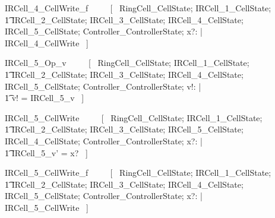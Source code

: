 \documentclass{article}
\begin{document}
\begin{zed}
IRCell\_4\_CellWrite\_f ~~~~ [~ 
    \Xi RingCell\_CellState; 
    \Xi IRCell\_1\_CellState; \\
    \t1 \Xi IRCell\_2\_CellState; 
    \Xi IRCell\_3\_CellState;
    \Xi IRCell\_4\_CellState; 
    \Xi IRCell\_5\_CellState; 
    \Xi Controller\_ControllerState; 
    x?: \nat | \\
    \lnot \pre IRCell\_4\_CellWrite ~] \\
\end{zed}
\begin{zed}
IRCell\_5\_Op\_v ~~~~ [~ 
    \Xi RingCell\_CellState; 
    \Xi IRCell\_1\_CellState; \\
    \t1 \Xi IRCell\_2\_CellState; 
    \Xi IRCell\_3\_CellState;
    \Xi IRCell\_4\_CellState; 
    \Xi IRCell\_5\_CellState; 
    \Xi Controller\_ControllerState; v!: \nat | \\
    \t1 v! = IRCell\_5\_v ~] \\
\end{zed}

\begin{zed}
IRCell\_5\_CellWrite ~~~~ [~ 
    \Xi RingCell\_CellState; 
    \Xi IRCell\_1\_CellState; \\
    \t1 \Xi IRCell\_2\_CellState; 
    \Xi IRCell\_3\_CellState; 
    \Delta IRCell\_5\_CellState;
    \Xi IRCell\_4\_CellState; 
    \Xi Controller\_ControllerState; 
    x?: \nat | \\
    \t1 IRCell\_5\_v' = x? ~] \\
\end{zed}

\begin{zed}
IRCell\_5\_CellWrite\_f ~~~~ [~ 
    \Xi RingCell\_CellState; 
    \Xi IRCell\_1\_CellState; \\
    \t1 \Xi IRCell\_2\_CellState; 
    \Xi IRCell\_3\_CellState;
    \Xi IRCell\_4\_CellState; 
    \Xi IRCell\_5\_CellState; 
    \Xi Controller\_ControllerState; 
    x?: \nat | \\
    \lnot \pre IRCell\_5\_CellWrite ~] \\
\end{zed}
\end{document}
